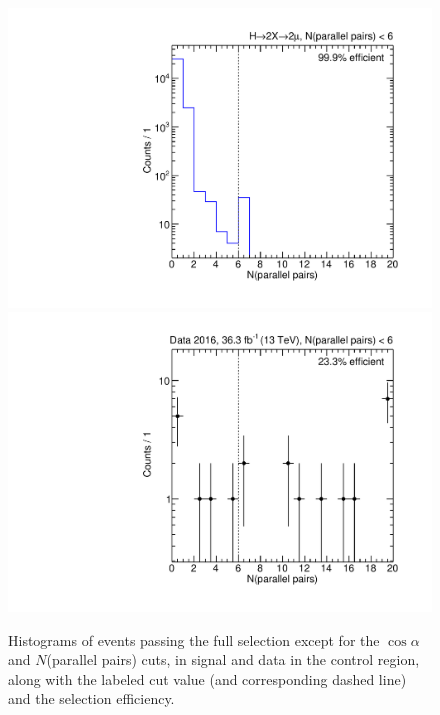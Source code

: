 \begin{figure}[p]
  \centering
  \includegraphics[width=\DSquareWidth]{figures/displaced/NM1_2Mu2J_Npp.pdf}
  \hspace*{-2em}
  \includegraphics[width=\DSquareWidth]{figures/displaced/NM1_Data_Npp.pdf}
  \caption[Histograms of events passing the full selection except for the $\cos{\alpha}$ and $N$(parallel pairs) cuts in \twoMu signal and data.]{Histograms of events passing the full selection except for the $\cos{\alpha}$ and $N$(parallel pairs) cuts, in  \twoMu signal and  data in the control region, along with the labeled cut value (and corresponding dashed line) and the selection efficiency.}
  \label{fig:dd:NM1_Npp}
\end{figure}

